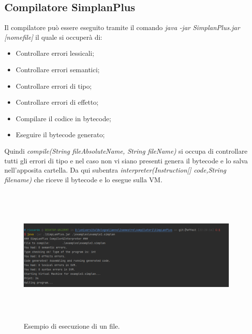 \documentclass[../../main]{subfiles}
\begin{document}
\subsection{Compilatore SimplanPlus}
Il compilatore può essere eseguito tramite il comando \textit{java -jar SimplanPlus.jar [nomefile]} il quale si occuperà di:
\begin{itemize}
    \item Controllare errori lessicali;
    \item Controllare errori semantici;
    \item Controllare errori di tipo;
    \item Controllare errori di effetto;
    \item Compilare il codice in bytecode;
    \item Eseguire il bytecode generato;
\end{itemize}

Quindi \textit{compile(String fileAbsoluteName, String fileName)} si occupa di controllare tutti gli errori di tipo e nel caso non vi siano presenti
genera il bytecode e lo salva nell'apposita cartella. Da qui subentra \textit{interpreter(Instruction[] code,String filename)} che riceve il bytecode 
e lo esegue sulla VM.
\begin{figure}[H]
    \includegraphics[width=170mm,height=70mm]{images/esempioesec.png}
    \caption{Esempio di esecuzione di un file.}
\end{figure}
\end{document}
